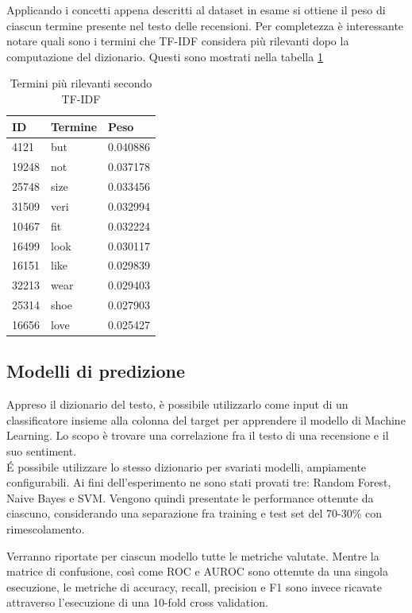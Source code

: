 \documentclass[hidelinks, 12pt]{article}
\begin{document}
Applicando i concetti appena descritti al dataset in esame si ottiene il peso di ciascun termine presente nel testo delle recensioni. Per completezza è interessante notare quali sono i termini che TF-IDF considera più rilevanti dopo la computazione del dizionario. Questi sono mostrati nella tabella \ref{tab:term-weights}

\begin{table}[H]
	\caption{Termini più rilevanti secondo TF-IDF}\label{tab:term-weights}
	\centering
	\begin{tabular}{|l|l|l|}
		\hline
		ID & Termine & Peso \\
		\hline
		4121 & but & 0.040886 \\ 
		19248 & not & 0.037178 \\ 
		25748 & size & 0.033456 \\ 
		31509 & veri & 0.032994 \\ 
		10467 & fit & 0.032224 \\ 
		16499 & look & 0.030117 \\ 
		16151 & like & 0.029839 \\ 
		32213 & wear & 0.029403 \\ 
		25314 & shoe & 0.027903 \\ 
		16656 & love & 0.025427 \\ 
		\hline
	\end{tabular}
\end{table}



\subsection{Modelli di predizione}

Appreso il dizionario del testo, è possibile utilizzarlo come input di un classificatore insieme alla colonna del target per apprendere il modello di Machine Learning. Lo scopo è trovare una correlazione fra il testo di una recensione e il suo sentiment. \\
É possibile utilizzare lo stesso dizionario per svariati modelli, ampiamente configurabili. Ai fini dell'esperimento ne sono stati provati tre: Random Forest, Naive Bayes e SVM. Vengono quindi presentate le performance ottenute da ciascuno, considerando una separazione fra training e test set del 70-30\% con rimescolamento.

Verranno riportate per ciascun modello tutte le metriche valutate. Mentre la matrice di confusione, così come ROC e AUROC sono ottenute da una singola esecuzione, le metriche di accuracy, recall, precision e F1 sono invece ricavate attraverso l'esecuzione di una 10-fold cross validation.
\end{document}
